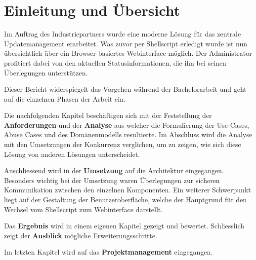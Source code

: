 \begin{comment}
Einführung in die Problem- und Aufgabenstellung. Übersicht über die übrigen Teile der Abgabe.

Diese Einleitung soll für den Ingenieur irgendeiner Fachrichtung verständlich sein. Sie stellt die Aufgabe in einen grösseren Zusammenhang und liefert eine genaue Beschreibung der Problemstellung. Allfällige Vorarbeiten oder ähnlich gelagerte Arbeiten werden diskutiert.
\end{comment}

\chapter{Einleitung und Übersicht}

Im Auftrag des Industriepartners wurde eine moderne Lösung für das zentrale Updatemanagement erarbeitet. Was zuvor per Shellscript erledigt wurde ist nun übersichtlich über ein Browser-basiertes Webinterface möglich. Der Administrator profitiert dabei von den aktuellen Statusinformationen, die ihn bei seinen Überlegungen unterstützen.

Dieser Bericht widerspiegelt das Vorgehen während der Bachelorarbeit und geht auf die einzelnen Phasen der Arbeit ein.

Die nachfolgenden Kapitel beschäftigen sich mit der Feststellung der \textbf{Anforderungen} und der \textbf{Ana\-ly\-se} aus welcher die Formulierung der Use Cases, Abuse Cases und des Domänenmodells resultierte. Im Abschluss wird die Analyse mit den Umsetzungen der Konkurrenz verglichen, um zu zeigen, wie sich diese Lösung von anderen Lösungen unterscheidet.

Anschliessend wird in der \textbf{Umsetzung} auf die Architektur eingegangen. Besonders wichtig bei der Umsetzung waren Überlegungen zur sicheren Kommunikation zwischen den einzelnen Komponenten. Ein weiterer Schwerpunkt liegt auf der Gestaltung der Benutzeroberfläche, welche der Hauptgrund für den Wechsel vom Shellscript zum Webinterface darstellt.

Das \textbf{Ergebnis} wird in einem eigenen Kapitel gezeigt und bewertet. Schliesslich zeigt der \textbf{Ausblick} mögliche Erweiterungsschritte.

Im letzten Kapitel wird auf das \textbf{Projektmanagement} eingegangen.
